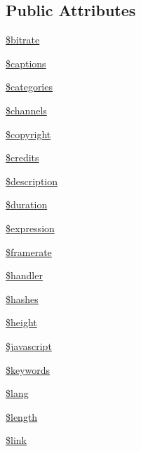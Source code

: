 \subsection*{Public Attributes}
\begin{DoxyCompactItemize}
\item 
\hyperlink{class_simple_pie___enclosure_ac5a8d99bb4e92c5c88794cb875dd1cfb}{\$bitrate}
\item 
\hyperlink{class_simple_pie___enclosure_aa3ccd8df0778abe4878f51f52f4a24ae}{\$captions}
\item 
\hyperlink{class_simple_pie___enclosure_a855fd8922ddbd464fadbe2ff4236debb}{\$categories}
\item 
\hyperlink{class_simple_pie___enclosure_ac1b47157a7b45a9d4417d989f25b7390}{\$channels}
\item 
\hyperlink{class_simple_pie___enclosure_a012af059099c08a92af4c3ec75d613cc}{\$copyright}
\item 
\hyperlink{class_simple_pie___enclosure_a39ec4164a1a0c2bdfbfa7d2fb89dc17b}{\$credits}
\item 
\hyperlink{class_simple_pie___enclosure_a2b0c7f415c4a457775d1d3afe547542d}{\$description}
\item 
\hyperlink{class_simple_pie___enclosure_ab5628304fd3b2964981fbf2f51233cff}{\$duration}
\item 
\hyperlink{class_simple_pie___enclosure_a66f01a6c04228ba71556c13a807acf91}{\$expression}
\item 
\hyperlink{class_simple_pie___enclosure_a850e7c72478cdf903906ebd616a19ac2}{\$framerate}
\item 
\hyperlink{class_simple_pie___enclosure_a826aadca610567fcf6f83746e92651f0}{\$handler}
\item 
\hyperlink{class_simple_pie___enclosure_a484c4bf4c77a8f11a8680eb50d148003}{\$hashes}
\item 
\hyperlink{class_simple_pie___enclosure_a00bde1b8b9ea8ebb7fbdb0ade009188b}{\$height}
\item 
\hyperlink{class_simple_pie___enclosure_ae518181d052cc01055fb4dbd7be9e02d}{\$javascript}
\item 
\hyperlink{class_simple_pie___enclosure_aa6919099461446251ffba67409cbee57}{\$keywords}
\item 
\hyperlink{class_simple_pie___enclosure_ad8e56c150e856e92e09556b180dbd9f4}{\$lang}
\item 
\hyperlink{class_simple_pie___enclosure_a02535454e4ffae680bd95feb30d9a8af}{\$length}
\item 
\hyperlink{class_simple_pie___enclosure_a518b991a46944c1108009f500d15ec1e}{\$link}

\end{DoxyCompactItemize}
